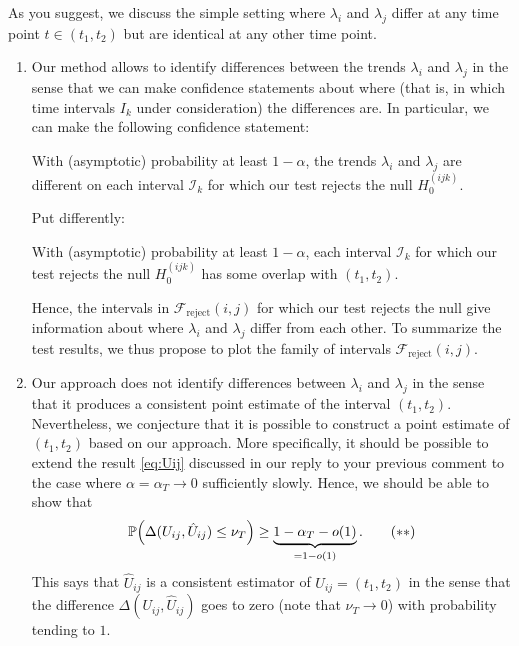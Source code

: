 \documentclass[a4paper,12pt]{article}
\begin{document}
\begin{enumerate}[label=(\arabic*),leftmargin=0.7cm]
As you suggest, we discuss the simple setting where $\lambda_i$ and $\lambda_j$ differ at any time point $t \in (t_1,t_2)$ but are identical at any other time point.
\begin{enumerate}[label=(\roman*),leftmargin=0.75cm]

\item Our method allows to identify differences between the trends $\lambda_i$ and $\lambda_j$ in the sense that we can make confidence statements about where (that is, in which time intervals $I_k$ under consideration) the differences are. In particular, we can make the following confidence statement: 
\vspace{0.1cm}

\begin{center}
\begin{minipage}{0.8\textwidth}
With (asymptotic) probability at least $1-\alpha$, the trends $\lambda_i$ and $\lambda_j$ are different on each interval $\mathcal{I}_k$ for which our test rejects the null $H_0^{(ijk)}$.
\end{minipage}
\end{center} 
\vspace{0.1cm}

Put differently:
\vspace{0.1cm}

\begin{center}
\begin{minipage}{0.8\textwidth}
With (asymptotic) probability at least $1-\alpha$, each interval $\mathcal{I}_k$ for which our test rejects the null $H_0^{(ijk)}$ has some overlap with $(t_1,t_2)$.
\end{minipage}
\end{center}
\vspace{0.1cm}

Hence, the intervals in $\mathcal{F}_{\text{reject}}(i,j)$ for which our test rejects the null give information about where $\lambda_i$ and $\lambda_j$ differ from each other. To summarize the test results, we thus propose to plot the family of intervals $\mathcal{F}_{\text{reject}}(i,j)$. 

\item Our approach does not identify differences between $\lambda_i$ and $\lambda_j$ in the sense that it produces a consistent point estimate of the interval $(t_1,t_2)$. Nevertheless, we conjecture that it is possible to construct a point estimate of $(t_1,t_2)$ based on our approach. More specifically, it should be possible to extend the result \eqref{eq:Uij} discussed in our reply to your previous comment to the case where $\alpha = \alpha_T \to 0$ sufficiently slowly. Hence, we should be able to show that 
\begin{equation}\label{eq:Uij-conjecture}
\mathbb{P} \Big( \Delta(U_{ij}, \hat{U}_{ij}) \le \nu_T \Big) \ge \underbrace{1-\alpha_T - o(1)}_{= 1 - o(1)}. \tag{$**$}
\end{equation}
This says that $\hat{U}_{ij}$ is a consistent estimator of $U_{ij} = (t_1,t_2)$ in the sense that the difference $\Delta(U_{ij}, \hat{U}_{ij})$ goes to zero (note that $\nu_T \to 0$) with probability tending to $1$. 
\end{enumerate}


\end{enumerate}
\end{document}
